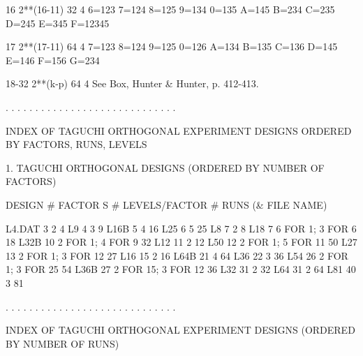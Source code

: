      16      2**(16-11)  32      4     6=123 7=124
                                        8=125 9=134
                                        0=135 A=145
                                        B=234 C=235
                                        D=245 E=345
                                        F=12345
 
      17      2**(17-11)  64      4     7=123 8=124
                                        9=125 0=126
                                        A=134 B=135
                                        C=136 D=145
                                        E=146 F=156
                                        G=234
 
      18-32   2**(k-p)    64      4     See Box,
                                        Hunter &
                                        Hunter, p.
                                        412-413.
 
. . . . . . . . . . . . . . . . . . . . . . . . . . . . .
 
   INDEX OF TAGUCHI ORTHOGONAL EXPERIMENT DESIGNS
         ORDERED BY FACTORS, RUNS, LEVELS
 
 
           1. TAGUCHI ORTHOGONAL DESIGNS
           (ORDERED BY NUMBER OF FACTORS)
 
  DESIGN     # FACTOR S    # LEVELS/FACTOR        # RUNS
(& FILE NAME)
 
  L4.DAT         3            2                      4
  L9             4            3                      9
  L16B           5            4                     16
  L25            6            5                     25
  L8             7            2                      8
  L18            7            6 FOR  1; 3 FOR   6   18
  L32B          10            2 FOR  1; 4 FOR   9   32
  L12           11            2                     12
  L50           12            2 FOR  1; 5 FOR  11   50
  L27           13            2 FOR  1; 3 FOR  12   27
  L16           15            2                     16
  L64B          21            4                     64
  L36           22            3                     36
  L54           26            2 FOR  1; 3 FOR  25   54
  L36B          27            2 FOR 15; 3 FOR  12   36
  L32           31            2                     32
  L64           31            2                     64
  L81           40            3                     81
 
. . . . . . . . . . . . . . . . . . . . . . . . . . . . .
 
   INDEX OF TAGUCHI ORTHOGONAL EXPERIMENT DESIGNS
           (ORDERED BY NUMBER OF RUNS)
 
